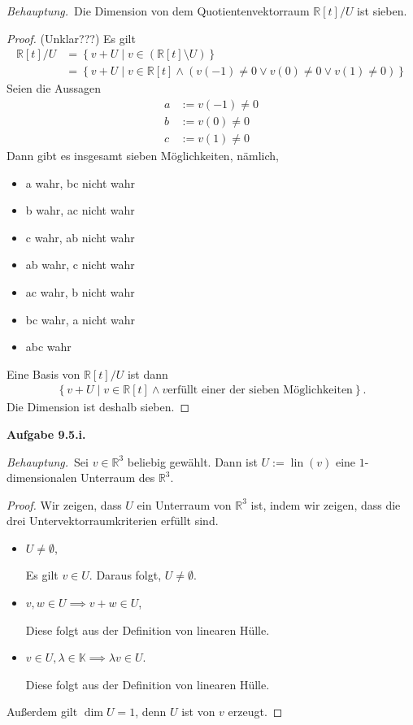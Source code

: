 \documentclass[12pt]{extarticle}
\newcommand{\mg}[1]{\mathbb{#1}}
\newcommand{\lin}{\operatorname{lin}}
\newcommand{\aufgn}[1]{\textbf{Aufgabe #1.}}
\newcommand{\beh}{\textit{Behauptung.}\ }
\begin{document}
\beh Die Dimension von dem Quotientenvektorraum
\(\mg{R}[t]/U\) ist sieben.

\begin{proof}
  (Unklar???)
Es gilt
\begin{align*}
  \mg{R}[t] / U &= \left\{ v + U \mid v \in (\mg{R}[t]
                  \setminus U) \right\} \\
                &= \left\{ v + U \mid v \in \mg{R}[t]
                  \wedge (v(-1) \ne 0 \lor v(0) \ne 0
                  \lor v(1) \ne 0) \right\}
\end{align*}
Seien die Aussagen
\begin{align*}
  a &:= v(-1) \ne 0 \\
  b &:= v(0) \ne 0 \\
  c &:= v(1) \ne 0
\end{align*}
Dann gibt es insgesamt sieben Möglichkeiten, nämlich,
\begin{itemize}
\item a wahr, bc nicht wahr
\item b wahr, ac nicht wahr
\item c wahr, ab nicht wahr
\item ab wahr, c nicht wahr
\item ac wahr, b nicht wahr
\item bc wahr, a nicht wahr
\item abc wahr
\end{itemize}

Eine Basis von \(\mg{R}[t]/U\) ist dann
\begin{align*}
\left\{ v + U \mid v \in \mg{R}[t] \wedge v \text{
  erfüllt einer der sieben Möglichkeiten} \right\}.
\end{align*}
Die Dimension ist deshalb sieben.
\end{proof}

\aufgn{9.5.i}

\beh Sei \(v \in \mg{R}^3\) beliebig gewählt.  Dann ist
\(U := \lin (v)\) eine \(1\)-dimensionalen Unterraum des
\(\mg{R}^3\).

\begin{proof}
Wir zeigen, dass \(U\) ein Unterraum von \(\mg{R}^3\) ist,
indem wir zeigen, dass die drei
Untervektorraumkriterien erfüllt sind.

\begin{itemize}
\item \(U \ne \emptyset\),

  Es gilt \(v \in U\).  Daraus folgt, $U
  \ne \emptyset$.
\item \(v, w \in U \implies v + w \in U\),

  Diese folgt aus der Definition von linearen Hülle.
\item $v \in U, \lambda \in \mg{K} \implies \lambda v
  \in U$.

  Diese folgt aus der Definition von linearen Hülle.
\end{itemize}

Außerdem gilt \(\dim U = 1\), denn \(U\) ist von \(v\) erzeugt.
\end{proof}
\end{document}

